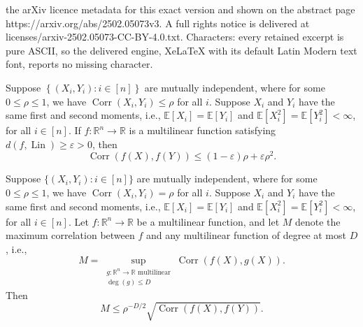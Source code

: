 \documentclass[10pt,a4paper]{amsart}
\def\Corr{\operatorname{Corr}}
\def\E{\mathbb{E}}
\def\Lin{\operatorname{Lin}}
\def\R{\mathbb{R}}
\def\deg{\operatorname{deg}}
\newcommand{\set}[1]{\left\{#1\right\}}
\begin{document}
the arXiv licence metadata for this exact version and shown on the abstract page https://arxiv.org/abs/2502.05073v3. A full rights notice is delivered at licenses/arxiv-2502.05073-CC-BY-4.0.txt. Characters: every retained excerpt is pure ASCII, so the delivered engine, XeLaTeX with its default Latin Modern text font, reports no missing character.
\begin{lemma}\label{lemma:multilinear}
    Suppose $\set{(X_i,Y_i):i\in[n]}$ are mutually independent, where for some $0\leq\rho\leq1$, we have $\Corr(X_i,Y_i)\leq\rho$ for all $i$.
    Suppose $X_i$ and $Y_i$ have the same first and second moments, i.e., $\E[X_i]=\E[Y_i]$ and $\E[X_i^2]=\E[Y_i^2]<\infty$, for all $i\in[n]$.
    If $f:\R^n\to\R$ is a multilinear function satisfying $d(f,\Lin)\geq\varepsilon>0$, then 
    \begin{equation}\label{eq:lemma_multilinear}
        \Corr(f(X),f(Y))\leq(1-\varepsilon)\rho+\varepsilon\rho^2.
    \end{equation}
\end{lemma}

\begin{lemma}\label{lemma:low_degree_multilinear}
    Suppose $\{(X_i,Y_i):i\in[n]\}$ are mutually independent, where for some $0\leq\rho\leq1$, we have $\Corr(X_i,Y_i)=\rho$ for all $i$.
    Suppose $X_i$ and $Y_i$ have the same first and second moments, i.e., $\E[X_i]=\E[Y_i]$ and $\E[X_i^2]=\E[Y_i^2]<\infty$, for all $i\in[n]$.
    Let $f:\R^n\to\R$ be a multilinear function, and let $M$ denote the maximum correlation between $f$ and any multilinear function of degree at most $D$, i.e.,
    \[ M = \sup_{\substack{g:\R^n\to\R\text{ multilinear}\\\deg(g)\leq D}} \Corr(f(X),g(X)). \]
    Then
    \[ M \leq \rho^{-D/2}\sqrt{\Corr(f(X),f(Y))}. \]
\end{lemma}
\end{document}
